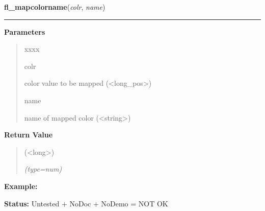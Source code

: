     \label{xformslib:library:fl_mapcolorname}

    \vspace{0.5ex}

\hspace{.8\funcindent}\begin{boxedminipage}{\funcwidth}

    \raggedright \textbf{fl\_mapcolorname}(\textit{colr}, \textit{name})

    \vspace{-1.5ex}

    \rule{\textwidth}{0.5\fboxrule}
\setlength{\parskip}{2ex}
\setlength{\parskip}{1ex}
      \textbf{Parameters}
      \vspace{-1ex}

      \begin{quote}
        \begin{Ventry}{xxxx}

          \item[colr]

          color value to be mapped ({\textless}long\_pos{\textgreater})

          \item[name]

          name of mapped color ({\textless}string{\textgreater})

        \end{Ventry}

      \end{quote}

      \textbf{Return Value}
    \vspace{-1ex}

      \begin{quote}
      ({\textless}long{\textgreater})

      {\it (type=num)}

      \end{quote}

\textbf{Example:} 

\textbf{Status:} Untested + NoDoc + NoDemo = NOT OK



    \end{boxedminipage}

    \label{xformslib:library:fl_mapcolorname}

